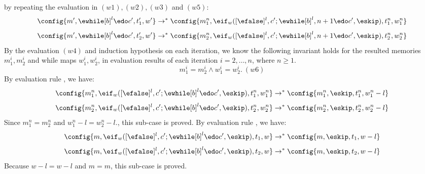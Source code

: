 {\begin{subproof}
by repeating the evaluation in $(w1), (w2), (w3)$ and $(w5)$:
%
\[
	\config{m', \ewhile [b]^l \edo c', t_1', w'} \to^{*} \config{m_1^n, \eif_w([\efalse]^l, c';\ewhile [b]^l, n + 1 \edo c', \eskip), t_1^n, w_1^n}
\]
%
\[
	\config{m', \ewhile [b]^l \edo c', t_2', w'} \to^{*} \config{m_2^n, \eif_w([\efalse]^l, c';\ewhile [b]^l, n + 1 \edo c', \eskip), t_2^n, w_2^n}
\]
%
By the evaluation $(w4)$ and induction hypothesis on each iteration, we know the following invariant holds for the resulted memories $m_1^i, m_2^i$ and while maps $w_1^i, w_2^i$,
in evaluation results of each iteration $i = 2, \ldots, n$, where $n \geq 1$. 
%
\[
m_1^i = m_2^i \land w_1^i = w_2^i. ~ (w6)
\]
%
%
By evaluation rule , we have:
%
\[
	\config{m_1^n, \eif_w([\efalse]^l, c';\ewhile [b]^l \edo c', \eskip), t_1^n, w_1^n} 
	\to^{*} \config{m_1^n, \eskip, t_1^n, w_1^n - l}
\]
%
\[
	\config{m_2^n, \eif_w([\efalse]^l, c';\ewhile [b]^l \edo c', \eskip), t_2^n, w_2^n} 
	\to^{*} \config{m_2^n, \eskip, t_2^n, w_2^n - l}
\]
%
Since $m_1^n = m_2^n$ and $w_1^n - l = w_2^n - l.$, this sub-case is proved.
%
%
By evaluation rule , we have:
%
\[
	\config{m, \eif_w([\efalse]^l, c';\ewhile [b]^l \edo c', \eskip), t_1, w} 
	\to^{*} \config{m, \eskip, t_1, w - l}
\]
%
%
\[
	\config{m, \eif_w([\efalse]^l, c';\ewhile [b]^l \edo c', \eskip), t_2, w} 
	\to^{*} \config{m, \eskip, t_2, w - l}
\]
%
Because $w - l = w - l$ and $m = m$, this sub-case is proved.
%
\end{subproof}
}